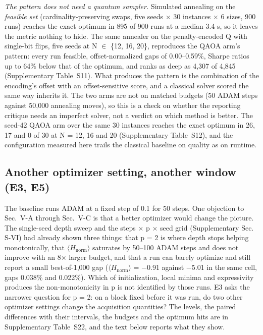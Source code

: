 \documentclass{ieeeaccess}
\begin{document}
\textit{The pattern does not need a quantum sampler.} Simulated annealing on the \textit{feasible set} (cardinality-preserving swaps, five seeds $\times$ 30 instances $\times$ 6 sizes, 900 runs) reaches the exact optimum in 895 of 900 runs at a median 3.4 s, so it leaves the metric nothing to hide. The same annealer on the penalty-encoded Q with single-bit flips, five seeds at N $\in$ \{12, 16, 20\}, reproduces the QAOA arm's pattern: every run feasible, offset-normalized gaps of 0.00--0.59\%, Sharpe ratios up to 64\% below that of the optimum, and ranks as deep as 4,307 of 4,845 (Supplementary Table~S11). What produces the pattern is the combination of the encoding's offset with an offset-sensitive score, and a classical solver scored the same way inherits it. The two arms are not on matched budgets (50 ADAM steps against 50,000 annealing moves), so this is a check on whether the reporting critique needs an imperfect solver, not a verdict on which method is better. The seed-42 QAOA arm over the same 30 instances reaches the exact optimum in 26, 17 and 0 of 30 at N = 12, 16 and 20 (Supplementary Table~S12), and the configuration measured here trails the classical baseline on quality as on runtime.


\subsection{Another optimizer setting, another window (E3, E5)}


The baseline runs ADAM at a fixed step of 0.1 for 50 steps. One objection to Sec.~V-A through Sec.~V-C is that a better optimizer would change the picture. The single-seed depth sweep and the steps $\times$ p $\times$ seed grid (Supplementary Sec. S-VI) had already shown three things: that p = 2 is where depth stops helping monotonically, that $\langle$$H_{\mathrm{norm}}$$\rangle$ saturates by 50--100 ADAM steps and does not improve with an 8$\times$ larger budget, and that a run can barely optimize and still report a small best-of-1,000 gap ($\langle$$H_{\mathrm{norm}}$$\rangle$ = $-$0.91 against $-$5.01 in the same cell, gaps 0.038\% and 0.022\%). Which of initialization, local minima and expressivity produces the non-monotonicity in p is not identified by those runs. E3 asks the narrower question for p = 2: on a block fixed before it was run, do two other optimizer settings change the acquisition quantities? The levels, the paired differences with their intervals, the budgets and the optimum hits are in Supplementary Table~S22, and the text below reports what they show.
\end{document}
